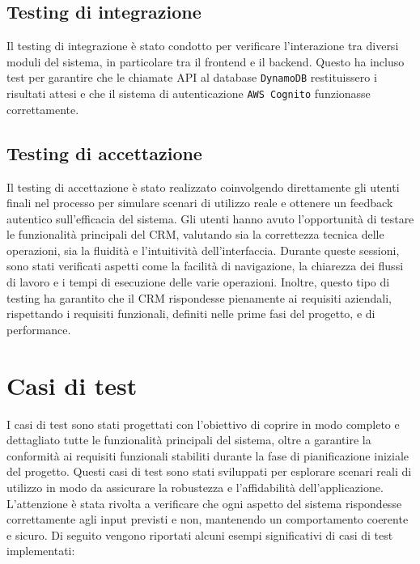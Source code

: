 \documentclass[target=bach,aauheader=,style=]{thud}
\begin{document}
\subsection{Testing di integrazione}
Il testing di integrazione è stato condotto per verificare l'interazione tra diversi moduli del sistema, in particolare tra il frontend e il backend. Questo ha incluso test per garantire che le chiamate API al database \texttt{DynamoDB} restituissero i risultati attesi e che il sistema di autenticazione \texttt{AWS Cognito} funzionasse correttamente.

\subsection{Testing di accettazione}
Il testing di accettazione è stato realizzato coinvolgendo direttamente gli utenti finali nel processo per simulare scenari di utilizzo reale e ottenere un feedback autentico sull'efficacia del sistema. Gli utenti hanno avuto l'opportunità di testare le funzionalità principali del CRM, valutando sia la correttezza tecnica delle operazioni, sia la fluidità e l'intuitività dell'interfaccia. Durante queste sessioni, sono stati verificati aspetti come la facilità di navigazione, la chiarezza dei flussi di lavoro e i tempi di esecuzione delle varie operazioni. Inoltre, questo tipo di testing ha garantito che il CRM rispondesse pienamente ai requisiti aziendali, rispettando i requisiti funzionali, definiti nelle prime fasi del progetto, e di performance.

\section{Casi di test}
I casi di test sono stati progettati con l'obiettivo di coprire in modo completo e dettagliato tutte le funzionalità principali del sistema, oltre a garantire la conformità ai requisiti funzionali stabiliti durante la fase di pianificazione iniziale del progetto. Questi casi di test sono stati sviluppati per esplorare scenari reali di utilizzo in modo da assicurare la robustezza e l'affidabilità dell'applicazione. L'attenzione è stata rivolta a verificare che ogni aspetto del sistema rispondesse correttamente agli input previsti e non, mantenendo un comportamento coerente e sicuro.  Di seguito vengono riportati alcuni esempi significativi di casi di test implementati:
\end{document}
